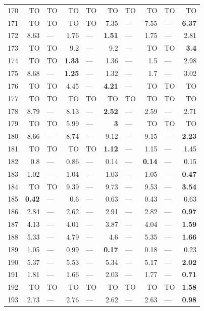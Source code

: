 \begin{longtable}{lr@{\hskip 4pt}l@{\hskip 12pt}r@{\hskip 4pt}l@{\hskip 12pt}r@{\hskip 4pt}l@{\hskip 12pt}r@{\hskip 4pt}l@{\hskip 12pt}r}
170 & TO & TO & TO & TO & TO & TO & TO & TO & TO \\
171 & TO & TO & TO & TO & 7.35 & --- & 7.55 & --- & \textbf{6.37} \\
172 & 8.63 & --- & 1.76 & --- & \textbf{1.51} & --- & 1.75 & --- & 2.81 \\
173 & TO & TO & 9.2 & --- & 9.2 & --- & TO & TO & \textbf{3.4} \\
174 & TO & TO & \textbf{1.33} & --- & 1.36 & --- & 1.5 & --- & 2.98 \\
175 & 8.68 & --- & \textbf{1.25} & --- & 1.32 & --- & 1.7 & --- & 3.02 \\
176 & TO & TO & 4.45 & --- & \textbf{4.21} & --- & TO & TO & TO \\
177 & TO & TO & TO & TO & TO & TO & TO & TO & TO \\
178 & 8.79 & --- & 8.13 & --- & \textbf{2.52} & --- & 2.59 & --- & 2.71 \\
179 & TO & TO & 5.99 & --- & \textbf{3} & --- & TO & TO & TO \\
180 & 8.66 & --- & 8.74 & --- & 9.12 & --- & 9.15 & --- & \textbf{2.23} \\
181 & TO & TO & TO & TO & \textbf{1.12} & --- & 1.15 & --- & 1.45 \\
182 & 0.8 & --- & 0.86 & --- & 0.14 & --- & \textbf{0.14} & --- & 0.15 \\
183 & 1.02 & --- & 1.04 & --- & 1.03 & --- & 1.05 & --- & \textbf{0.47} \\
184 & TO & TO & 9.39 & --- & 9.73 & --- & 9.53 & --- & \textbf{3.54} \\
185 & \textbf{0.42} & --- & 0.6 & --- & 0.63 & --- & 0.43 & --- & 0.63 \\
186 & 2.84 & --- & 2.62 & --- & 2.91 & --- & 2.82 & --- & \textbf{0.97} \\
187 & 4.13 & --- & 4.01 & --- & 3.87 & --- & 4.04 & --- & \textbf{1.59} \\
188 & 5.33 & --- & 4.79 & --- & 4.6 & --- & 5.35 & --- & \textbf{1.66} \\
189 & 1.05 & --- & 0.99 & --- & \textbf{0.17} & --- & 0.18 & --- & 0.23 \\
190 & 5.37 & --- & 5.53 & --- & 5.34 & --- & 5.17 & --- & \textbf{2.02} \\
191 & 1.81 & --- & 1.66 & --- & 2.03 & --- & 1.77 & --- & \textbf{0.71} \\
192 & TO & TO & TO & TO & TO & TO & TO & TO & \textbf{1.58} \\
193 & 2.73 & --- & 2.76 & --- & 2.62 & --- & 2.63 & --- & \textbf{0.98} \\

\end{longtable}
